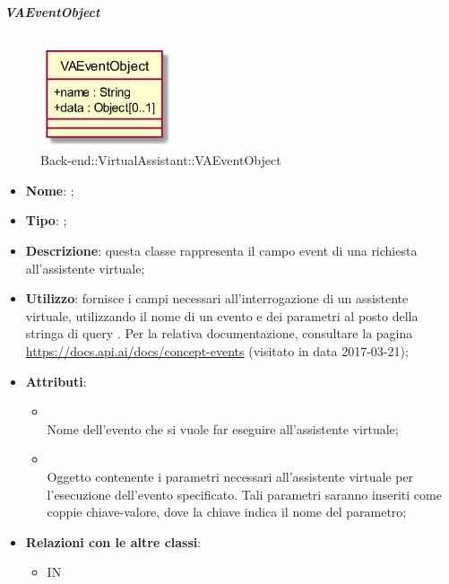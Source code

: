 \hypertarget{VAEventObject_label}{\subparagraph{VAEventObject}}
\begin{figure}[h]
	\centering
	\includegraphics[width=0.35\textwidth,height=\textheight,keepaspectratio]{images/ClassVAEventObject.png}
	\caption{Back-end::VirtualAssistant::VAEventObject}
\end{figure}
\begin{itemize}
	\item \textbf{Nome}: ;
	\item \textbf{Tipo}: ;
	\item \textbf{Descrizione}: questa classe rappresenta il campo event di una richiesta all'assistente virtuale;
	\item \textbf{Utilizzo}: fornisce i campi necessari all'interrogazione di un assistente virtuale, utilizzando il nome di un evento e dei parametri al posto della stringa di query .
	Per la relativa documentazione, consultare la pagina \url{https://docs.api.ai/docs/concept-events}  (visitato in data 2017-03-21);
	\item \textbf{Attributi}:
	\begin{itemize}
		\item[]  \\
		Nome dell'evento che si vuole far eseguire all'assistente virtuale;
		\item[]  \\
		Oggetto contenente i parametri necessari all'assistente virtuale per l'esecuzione dell'evento specificato. Tali parametri saranno inseriti come coppie chiave-valore, dove la chiave indica il nome del parametro;
	\end{itemize}
	\item \textbf{Relazioni con le altre classi}:
	\begin{itemize}
		\item IN \hyperlink{VAQuery_label}{}
	\end{itemize}
\end{itemize}
\FloatBarrier

